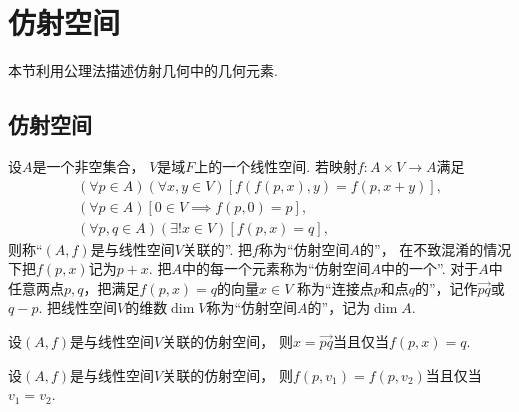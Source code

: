 \section{仿射空间}
本节利用公理法描述仿射几何中的几何元素.

\subsection{仿射空间}
\begin{definition}
设\(A\)是一个非空集合，
\(V\)是域\(F\)上的一个线性空间.
若映射\(f\colon A \times V \to A\)满足\begin{gather*}
	(\forall p \in A)
	(\forall x,y \in V)
	[
		f(f(p,x),y)
		= f(p,x+y)
	], \\
	(\forall p \in A)
	[
		0 \in V
		\implies
		f(p,0) = p
	], \\
	(\forall p,q \in A)
	(\exists! x \in V)
	[
		f(p,x) = q
	],
\end{gather*}
则称“\((A,f)\)是与线性空间\(V\)关联的”.
把\(f\)称为“仿射空间\(A\)的”，
在不致混淆的情况下把\(f(p,x)\)记为\(p + x\).
把\(A\)中的每一个元素称为“仿射空间\(A\)中的一个”.
对于\(A\)中任意两点\(p,q\)，把满足\(f(p,x) = q\)的向量\(x \in V\)
称为“连接点\(p\)和点\(q\)的”，记作\(\vec{pq}\)或\(q - p\).
把线性空间\(V\)的维数\(\dim V\)称为“仿射空间\(A\)的”，记为\(\dim A\).
\end{definition}

\begin{property}%
设\((A,f)\)是与线性空间\(V\)关联的仿射空间，
则\(x = \vec{pq}\)当且仅当\(f(p,x) = q\).
\end{property}

\begin{property}%
设\((A,f)\)是与线性空间\(V\)关联的仿射空间，
则\(f(p,v_1) = f(p,v_2)\)当且仅当\(v_1 = v_2\).
\end{property}

